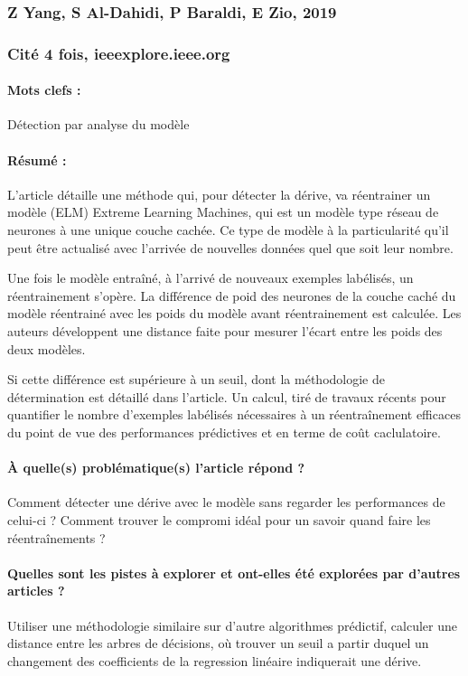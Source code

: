 \documentclass[11pt,a4paper]{report}
\begin{document}
\subsubsection{Z Yang, S Al-Dahidi, P Baraldi, E Zio, 2019}

\subsubsection{Cité 4 fois, ieeexplore.ieee.org}

\paragraph{Mots clefs :} Détection par analyse du modèle

\paragraph{Résumé :} L'article détaille une méthode qui, pour détecter la dérive, va réentrainer un modèle (ELM) Extreme Learning Machines, qui est un modèle type réseau de neurones à une unique couche cachée. Ce type de modèle à la particularité qu'il peut être actualisé avec l'arrivée de nouvelles données quel que soit leur nombre.

Une fois le modèle entraîné, à l'arrivé de nouveaux exemples labélisés, un réentrainement s'opère. La différence de poid des neurones de la couche caché du modèle réentrainé avec les poids du modèle avant réentrainement est calculée. Les auteurs développent une distance faite pour mesurer l'écart entre les poids des deux modèles.

Si cette différence est supérieure à un seuil, dont la méthodologie de détermination est détaillé dans l'article. Un calcul, tiré de travaux récents pour quantifier le nombre d'exemples labélisés nécessaires à un réentraînement efficaces du point de vue des performances prédictives et en terme de coût caclulatoire.

\paragraph{À quelle(s) problématique(s) l'article répond ?} Comment détecter une dérive avec le modèle sans regarder les performances de celui-ci ? Comment trouver le compromi idéal pour un savoir quand faire les réentraînements ?

\paragraph{Quelles sont les pistes à explorer et ont-elles  été explorées par d'autres articles ?} Utiliser une méthodologie similaire sur d'autre algorithmes prédictif, calculer une distance entre les arbres de décisions, où trouver un seuil a partir duquel un changement des coefficients de la regression linéaire indiquerait une dérive.
\end{document}
